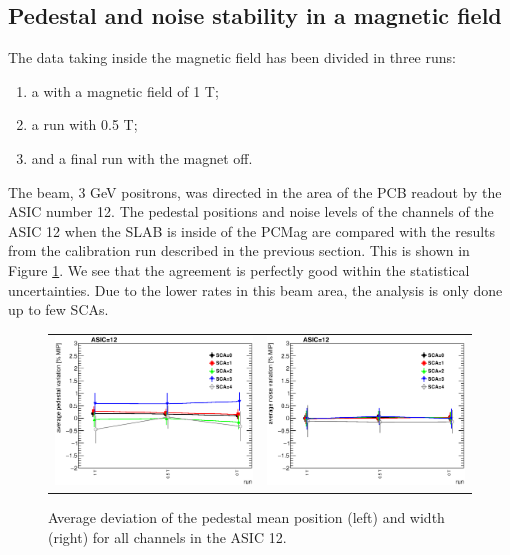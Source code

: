\documentclass[a4paper,11pt]{article}
\begin{document}
\subsection{Pedestal and noise stability in a magnetic field}
\label{sec:magnetic}

The data taking inside the magnetic field has been divided in three runs:
\begin{enumerate}
\item a with a magnetic field of 1 T;
\item a run with 0.5 T;
\item and a final run with the magnet off.
\end{enumerate}

The beam, 3 GeV positrons, was directed in the area of the PCB readout by the ASIC number 12.
The pedestal positions and noise levels of the channels of the ASIC 12 when the
SLAB is inside of the PCMag are compared with the results from the calibration run described in the previous section.
This is shown in Figure \ref{pedestal_magnetic}.
We see that the agreement is perfectly good within the statistical uncertainties.
Due to the lower rates in this beam area, the
analysis is only done up to few SCAs.

\begin{figure}[!t]
  \centering
  \begin{tabular}{ll}
    \includegraphics[width=2.8in]{../figs/pedestal/1T/summary_pedestal_chip12.eps} & \includegraphics[width=2.8in]{../figs/pedestal/1T/summary_noise_chip12.eps}
  \end{tabular}
  \caption{Average deviation of the pedestal mean position (left) and width (right) for all channels in the ASIC 12.}
\label{pedestal_magnetic}
\end{figure}
\end{document}
